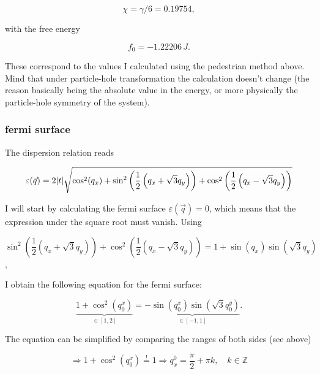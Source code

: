 \documentclass[../../../main.tex]{subfiles}
\begin{document}
\begin{equation}
\chi = \gamma/6  = 0.19754,
\end{equation}

with the free energy

\begin{equation}
	f_0 = -1.22206 \, J.
\end{equation}

These correspond to the values I calculated using the pedestrian method above. Mind that under particle-hole transformation the calculation doesn't change (the reason basically being the absolute value in the energy, or more physically the particle-hole symmetry of the system).

\subsubsection{fermi surface}

The dispersion relation reads 

\begin{equation}
	\varepsilon(\vec{q})  =2\abs{t}\sqrt{ \cos^2(q_x) + \sin^2\left(\frac12\left( q_x +\sqrt{3}q_y\right)\right) + \cos^2\left(\frac12\left(q_x - \sqrt{3}q_y\right)\right)}
\end{equation}

I will start by calculating the fermi surface $\varepsilon(\vec{q}) = 0$, which means that the expression under the square root must vanish. Using

\begin{equation}
	\sin^2\left(\frac12\left( q_x +\sqrt{3}q_y\right)\right) + \cos^2\left(\frac12\left(q_x - \sqrt{3}q_y\right)\right) = 1 + \sin(q_x)\sin(\sqrt{3}q_y)
\end{equation},

I obtain the following equation for the fermi surface:

\begin{equation}
	\underbrace{1 + \cos^2(q_{0}^x)}_{\in [1, 2]} = \underbrace{-\sin(q_{0}^x)\sin(\sqrt{3}q_{0}^y)}_{\in [-1, 1]}.
\end{equation}


The equation can be simplified by comparing the ranges of both sides (see above)

\begin{equation}
	\Rightarrow 1 + \cos^2(q_0^x) \overset{!}{=} 1\Rightarrow q^0_x = \frac{\pi}{2} + \pi k, \quad k \in \mathbb{Z}
\end{equation}
\end{document}
